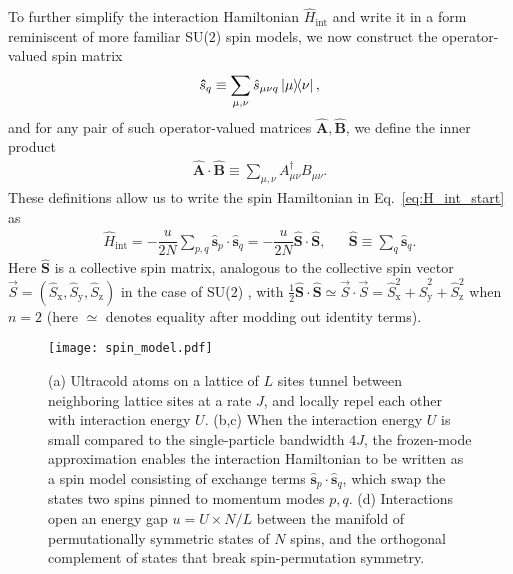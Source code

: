 \documentclass[aps,pra,nofootinbib,twocolumn,superscriptaddress]{revtex4-2}
\renewcommand{\t}{\text} %
\newcommand{\f}[2]{\dfrac{#1}{#2}} %
\renewcommand{\v}{\bm} %
\newcommand{\1}{\mathds{1}}
\newcommand{\s}{\hat s}
\renewcommand{\H}{\hat H}
\renewcommand{\S}{\hat S}
\newcommand{\x}{\text{x}}
\newcommand{\y}{\text{y}}
\newcommand{\z}{\text{z}}
\begin{document}
To further simplify the interaction Hamiltonian $\H_{\t{int}}$ and write it in a form reminiscent of more familiar SU($2$) spin models, we now construct the operator-valued spin matrix
\begin{align}
  \v\s_q \equiv \sum_{\mu,\nu} \s_{\mu\nu q} \op{\mu}{\nu},
\end{align}
and for any pair of such operator-valued matrices $\v{\hat{A}},\v{\hat{B}}$, we define the inner product
\begin{align}
  \v{\hat{A}} \cdot \v{\hat{B}}
  \equiv \sum_{\mu,\nu} A_{\mu\nu}^\dag B_{\mu\nu}.
  \label{eq:dot_product}
\end{align}
These definitions allow us to write the spin Hamiltonian in Eq.~\eqref{eq:H_int_start} as
\begin{align}
  \H_{\t{int}} = -\f{u}{2N} \sum_{p,q} \v\s_p\cdot\v\s_q
  = -\f{u}{2N}\v\S\cdot\v\S,
  &&
  \v\S \equiv \sum_q \v\s_q.
  \label{eq:H_int}
\end{align}
Here $\v\S$ is a collective spin matrix, analogous to the collective spin vector $\vec S=(\S_\x,\S_\y,\S_\z)$ in the case of SU($2$) \cite{he2019engineering}, with $\frac12\v\S\cdot\v\S \simeq \vec S\cdot\vec S = \S_\x^2 + \S_\y^2 + \S_\z^2$ when $n=2$ (here $\simeq$ denotes equality after modding out identity terms).

\begin{figure}
\centering
\texttt{[image: spin\_model.pdf]}
\caption{
(a) Ultracold atoms on a lattice of $L$ sites tunnel between neighboring lattice sites at a rate $J$, and locally repel each other with interaction energy $U$.
(b,c) When the interaction energy $U$ is small compared to the single-particle bandwidth $4J$, the frozen-mode approximation enables the interaction Hamiltonian to be written as a spin model consisting of exchange terms $\v\s_p\cdot\v\s_q$, which swap the states two spins pinned to momentum modes $p,q$.
(d) Interactions open an energy gap $u=U\times N/L$ between the manifold of permutationally symmetric states of $N$ spins, and the orthogonal complement of states that break spin-permutation symmetry.
}
\label{fig:spin_model}
\end{figure}
\end{document}
